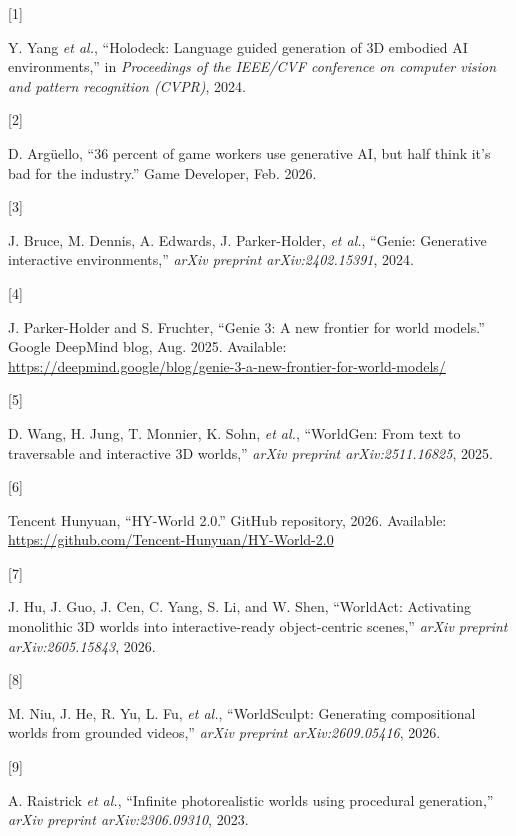 \documentclass[
  11pt,
]{article}
\newlength{\cslhangindent}
\newlength{\csllabelwidth}
\newenvironment{CSLReferences}[2] %
 {\begin{list}{}{%
  \setlength{\itemindent}{0pt}
  \setlength{\leftmargin}{0pt}
  \setlength{\parsep}{0pt}
  \ifodd #1
   \setlength{\leftmargin}{\cslhangindent}
   \setlength{\itemindent}{-1\cslhangindent}
  \fi
  \setlength{\itemsep}{#2\baselineskip}}}
 {\end{list}}
\newcommand{\CSLLeftMargin}[1]{\parbox[t]{\csllabelwidth}{\strut#1\strut}}
\newcommand{\CSLRightInline}[1]{\parbox[t]{\linewidth - \csllabelwidth}{\strut#1\strut}}
\begin{document}
\protect{}\label{refs}
\begin{CSLReferences}{0}{0}
\CSLLeftMargin{{[}1{]} }%
\CSLRightInline{{Y. Yang \emph{et al.}}, {``Holodeck: Language guided
generation of {3D} embodied {AI} environments,''} in \emph{Proceedings
of the IEEE/CVF conference on computer vision and pattern recognition
(CVPR)}, 2024.}

\CSLLeftMargin{{[}2{]} }%
\CSLRightInline{D. Argüello, {``{36 percent of game workers use
generative {AI}, but half think it's bad for the industry}.''} Game
Developer, Feb. 2026.}

\CSLLeftMargin{{[}3{]} }%
\CSLRightInline{{J. Bruce, M. Dennis, A. Edwards, J. Parker-Holder,
\emph{et al.}}, {``{Genie}: Generative interactive environments,''}
\emph{arXiv preprint arXiv:2402.15391}, 2024.}

\CSLLeftMargin{{[}4{]} }%
\CSLRightInline{J. Parker-Holder and S. Fruchter, {``{Genie 3: A new
frontier for world models}.''} Google DeepMind blog, Aug. 2025.
Available:
\url{https://deepmind.google/blog/genie-3-a-new-frontier-for-world-models/}}

\CSLLeftMargin{{[}5{]} }%
\CSLRightInline{{D. Wang, H. Jung, T. Monnier, K. Sohn, \emph{et al.}},
{``{WorldGen}: From text to traversable and interactive {3D} worlds,''}
\emph{arXiv preprint arXiv:2511.16825}, 2025.}

\CSLLeftMargin{{[}6{]} }%
\CSLRightInline{Tencent Hunyuan, {``{HY-World} 2.0.''} GitHub
repository, 2026. Available:
\url{https://github.com/Tencent-Hunyuan/HY-World-2.0}}

\CSLLeftMargin{{[}7{]} }%
\CSLRightInline{J. Hu, J. Guo, J. Cen, C. Yang, S. Li, and W. Shen,
{``{WorldAct}: Activating monolithic {3D} worlds into interactive-ready
object-centric scenes,''} \emph{arXiv preprint arXiv:2605.15843}, 2026.}

\CSLLeftMargin{{[}8{]} }%
\CSLRightInline{{M. Niu, J. He, R. Yu, L. Fu, \emph{et al.}},
{``{WorldSculpt}: Generating compositional worlds from grounded
videos,''} \emph{arXiv preprint arXiv:2609.05416}, 2026.}

\CSLLeftMargin{{[}9{]} }%
\CSLRightInline{A. Raistrick \emph{et al.}, {``Infinite photorealistic
worlds using procedural generation,''} \emph{arXiv preprint
arXiv:2306.09310}, 2023.}


\end{CSLReferences}
\end{document}
